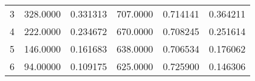 \begin{tabular}{lrrrrr}
\multicolumn{1}{c}{3}&\multicolumn{1}{c}{328.0000}&\multicolumn{1}{c}{0.331313}&\multicolumn{1}{c}{707.0000}&\multicolumn{1}{c}{0.714141}&\multicolumn{1}{c}{0.364211}\\
\multicolumn{1}{c}{4}&\multicolumn{1}{c}{222.0000}&\multicolumn{1}{c}{0.234672}&\multicolumn{1}{c}{670.0000}&\multicolumn{1}{c}{0.708245}&\multicolumn{1}{c}{0.251614}\\
\multicolumn{1}{c}{5}&\multicolumn{1}{c}{146.0000}&\multicolumn{1}{c}{0.161683}&\multicolumn{1}{c}{638.0000}&\multicolumn{1}{c}{0.706534}&\multicolumn{1}{c}{0.176062}\\
\multicolumn{1}{c}{6}&\multicolumn{1}{c}{94.00000}&\multicolumn{1}{c}{0.109175}&\multicolumn{1}{c}{625.0000}&\multicolumn{1}{c}{0.725900}&\multicolumn{1}{c}{0.146306}\\
\bottomrule
\end{tabular}
